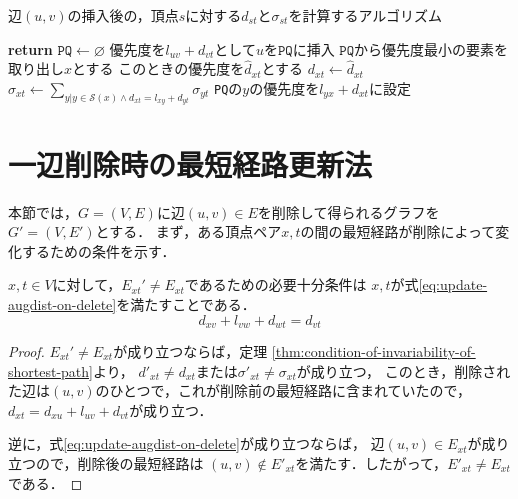 \begin{algorithm}[tb]
  \caption{辺$(u,v)$の挿入後の，頂点$s$に対する$d_{st}$と$\sigma_{st}$を計算するアルゴリズム}
  \label{alg:incremental-algorithm}
  \begin{algorithmic}[1]\small
    \State \textbf{return}
    \EndIf
    \State $\texttt{PQ}\gets\varnothing$
    \State 優先度を$l_{uv}+d_{vt}$として$u$を$\texttt{PQ}$に挿入
    \State $\texttt{PQ}$から優先度最小の要素を取り出し$x$とする
    \State このときの優先度を$\hat{d}_{xt}$とする
    \State $d_{xt}\gets\hat{d}_{xt}$
    \State $\sigma_{xt}\gets\sum_{y|y\in\mathcal{S}(x)\land d_{xt}=l_{xy}+d_{yt}}\sigma_{yt}$
    \State \texttt{PQ}の$y$の優先度を$l_{yx}+d_{xt}$に設定
    \EndIf
    \EndFor
    \EndWhile
    \EndProcedure
  \end{algorithmic}
\end{algorithm}

\section{一辺削除時の最短経路更新法}
\label{sect:update-apsp-on-delete}
本節では，$G=(V,E)$に辺$(u,v)\in E$を削除して得られるグラフを$G'=(V,E')$とする．
まず，ある頂点ペア$x,t$の間の最短経路が削除によって変化するための条件を示す．

\begin{lemma}
  \label{lmm:update-augdist-on-delete}
  $x,t\in V$に対して，$E_{xt}'\neq E_{xt}$であるための必要十分条件は
  $x,t$が式\eqref{eq:update-augdist-on-delete}を満たすことである．
  \begin{equation}
    d_{xv}+l_{vw}+d_{wt}=d_{vt}
    \label{eq:update-augdist-on-delete}
  \end{equation}
\end{lemma}
\begin{proof}
  $E_{xt}'\neq E_{xt}$が成り立つならば，定理
  \ref{thm:condition-of-invariability-of-shortest-path}より，
  $d'_{xt}\neq d_{xt}$または$\sigma'_{xt}\neq\sigma_{xt}$が成り立つ，
  このとき，削除された辺は$(u,v)$のひとつで，これが削除前の最短経路に含まれていたので，
  $d_{xt}=d_{xu}+l_{uv}+d_{vt}$が成り立つ．

  逆に，式\eqref{eq:update-augdist-on-delete}が成り立つならば，
  辺$(u,v)\in E_{xt}$が成り立つので，削除後の最短経路は
  $(u,v)\notin E'_{xt}$を満たす．したがって，$E'_{xt}\neq E_{xt}$である．
\end{proof}

